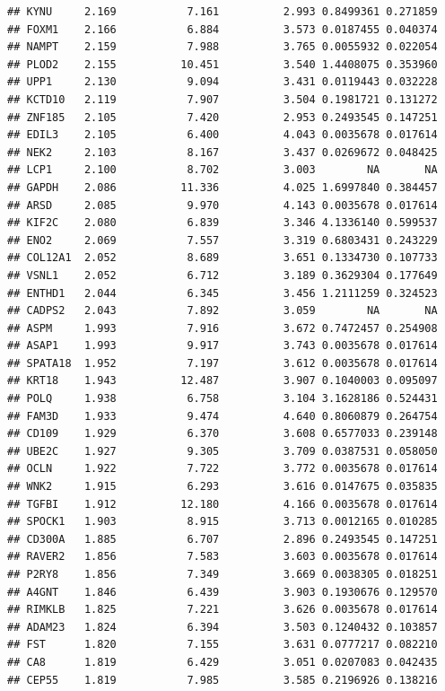 \documentclass{article}\usepackage[]{graphicx}\usepackage[]{color}
\makeatletter
\newenvironment{kframe}{%
 \def\at@end@of@kframe{}%
 \ifinner\ifhmode%
  \def\at@end@of@kframe{\end{minipage}}%
  \begin{minipage}{\columnwidth}%
 \fi\fi%
 \def\FrameCommand##1{\hskip\@totalleftmargin \hskip-\fboxsep
 \colorbox{shadecolor}{##1}\hskip-\fboxsep
     \hskip-\linewidth \hskip-\@totalleftmargin \hskip\columnwidth}%
 \MakeFramed {\advance\hsize-\width
   \@totalleftmargin\z@ \linewidth\hsize
   \@setminipage}}%
 {\par\unskip\endMakeFramed%
 \at@end@of@kframe}
\newenvironment{knitrout}{}{} %
\makeatother
\begin{document}
\begin{knitrout}
\begin{kframe}
\begin{verbatim}
## KYNU     2.169           7.161          2.993 0.8499361 0.271859
## FOXM1    2.166           6.884          3.573 0.0187455 0.040374
## NAMPT    2.159           7.988          3.765 0.0055932 0.022054
## PLOD2    2.155          10.451          3.540 1.4408075 0.353960
## UPP1     2.130           9.094          3.431 0.0119443 0.032228
## KCTD10   2.119           7.907          3.504 0.1981721 0.131272
## ZNF185   2.105           7.420          2.953 0.2493545 0.147251
## EDIL3    2.105           6.400          4.043 0.0035678 0.017614
## NEK2     2.103           8.167          3.437 0.0269672 0.048425
## LCP1     2.100           8.702          3.003        NA       NA
## GAPDH    2.086          11.336          4.025 1.6997840 0.384457
## ARSD     2.085           9.970          4.143 0.0035678 0.017614
## KIF2C    2.080           6.839          3.346 4.1336140 0.599537
## ENO2     2.069           7.557          3.319 0.6803431 0.243229
## COL12A1  2.052           8.689          3.651 0.1334730 0.107733
## VSNL1    2.052           6.712          3.189 0.3629304 0.177649
## ENTHD1   2.044           6.345          3.456 1.2111259 0.324523
## CADPS2   2.043           7.892          3.059        NA       NA
## ASPM     1.993           7.916          3.672 0.7472457 0.254908
## ASAP1    1.993           9.917          3.743 0.0035678 0.017614
## SPATA18  1.952           7.197          3.612 0.0035678 0.017614
## KRT18    1.943          12.487          3.907 0.1040003 0.095097
## POLQ     1.938           6.758          3.104 3.1628186 0.524431
## FAM3D    1.933           9.474          4.640 0.8060879 0.264754
## CD109    1.929           6.370          3.608 0.6577033 0.239148
## UBE2C    1.927           9.305          3.709 0.0387531 0.058050
## OCLN     1.922           7.722          3.772 0.0035678 0.017614
## WNK2     1.915           6.293          3.616 0.0147675 0.035835
## TGFBI    1.912          12.180          4.166 0.0035678 0.017614
## SPOCK1   1.903           8.915          3.713 0.0012165 0.010285
## CD300A   1.885           6.707          2.896 0.2493545 0.147251
## RAVER2   1.856           7.583          3.603 0.0035678 0.017614
## P2RY8    1.856           7.349          3.669 0.0038305 0.018251
## A4GNT    1.846           6.439          3.903 0.1930676 0.129570
## RIMKLB   1.825           7.221          3.626 0.0035678 0.017614
## ADAM23   1.824           6.394          3.503 0.1240432 0.103857
## FST      1.820           7.155          3.631 0.0777217 0.082210
## CA8      1.819           6.429          3.051 0.0207083 0.042435
## CEP55    1.819           7.985          3.585 0.2196926 0.138216

\end{verbatim}
\end{kframe}
\end{knitrout}
\end{document}
